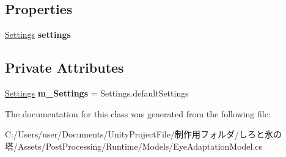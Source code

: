 \subsection*{Properties}
\begin{DoxyCompactItemize}
\item 
\mbox{\label{class_unity_engine_1_1_post_processing_1_1_eye_adaptation_model_ad90e61c36b7832a43da25e407c045dc4}} 
\hyperlink{struct_unity_engine_1_1_post_processing_1_1_eye_adaptation_model_1_1_settings}{Settings} {\bfseries settings}
\end{DoxyCompactItemize}
\subsection*{Private Attributes}
\begin{DoxyCompactItemize}
\item 
\mbox{\label{class_unity_engine_1_1_post_processing_1_1_eye_adaptation_model_a6fbdcfe3f1ad45cc061079708430ce8c}} 
\hyperlink{struct_unity_engine_1_1_post_processing_1_1_eye_adaptation_model_1_1_settings}{Settings} {\bfseries m\+\_\+\+Settings} = Settings.\+default\+Settings
\end{DoxyCompactItemize}


The documentation for this class was generated from the following file\+:\begin{DoxyCompactItemize}
\item 
C\+:/\+Users/user/\+Documents/\+Unity\+Project\+File/制作用フォルダ/しろと氷の塔/\+Assets/\+Post\+Processing/\+Runtime/\+Models/Eye\+Adaptation\+Model.\+cs\end{DoxyCompactItemize}

